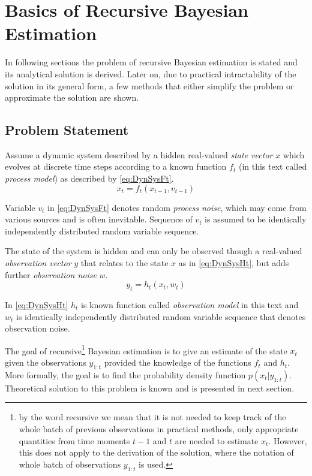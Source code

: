 \documentclass[a4paper,12pt,oneside]{report}
\newcommand{\pdf}{probability density function}
\begin{document}
\chapter{Basics of Recursive Bayesian Estimation}

In following sections the problem of recursive Bayesian estimation is stated and its analytical
solution is derived. Later on, due to practical intractability of the solution in its general form,
a few methods that either simplify the problem or approximate the solution are shown.

\section{Problem Statement}

Assume a dynamic system described by a hidden real-valued \emph{state vector} \(x\) which evolves at
discrete time steps according to a known function \(f_t\) (in this text called \emph{process model})
as described by \eqref{eq:DynSysFt}.
\begin{equation} \label{eq:DynSysFt}
	x_t = f_t(x_{t-1}, v_{t-1})
\end{equation}

Variable \(v_t\) in \eqref{eq:DynSysFt} denotes random \emph{process noise}, which may come from various
sources and is often inevitable. Sequence of \(v_t\) is assumed to be identically independently
distributed random variable sequence.

The state of the system is hidden and can only be observed though a real-valued \emph{observation vector}
\(y\) that relates to the state \(x\) as in \eqref{eq:DynSysHt}, but adds further \emph{observation
noise} \(w\).
\begin{equation} \label{eq:DynSysHt}
	y_t = h_t(x_t, w_t)
\end{equation}

In \eqref{eq:DynSysHt} \(h_t\) is known function called \emph{observation model} in this text and \(w_t\) is
identically independently distributed random variable sequence that denotes observation noise.

The goal of recursive\footnote{by the word recursive we mean that it is not needed to keep track of
the whole batch of previous observations in practical methods, only appropriate quantities from time
moments \(t-1\) and \(t\) are needed to estimate \(x_t\). However, this does not apply to the
derivation of the solution, where the notation of whole batch of observations \(y_{1:t}\) is used.}
Bayesian estimation is to give an estimate of the state \(x_t\) given the
observations \(y_{1:t}\) provided the knowledge of the functions \(f_t\) and \(h_t\).
More formally, the goal is to find the {\pdf} \(p(x_t | y_{1:t})\).
Theoretical solution to this problem is known and is presented in next section.
\end{document}
